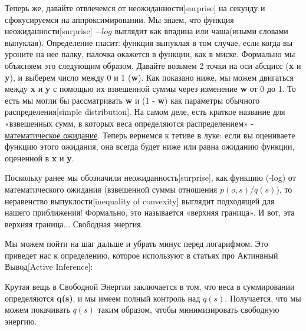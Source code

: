 \documentclass[twoside,leqno, 11pt]{article}
\begin{document}
	Теперь же, давайте отвлечемся от неожиданности[surprise] на секунду и сфокусируемся на аппроксимировании. Мы знаем, что функция неожиданности[surprise] $-log$ выглядит как впадина или чаша(иными словами выпуклая). Определение гласит: функция выпуклая в том случае, если когда вы уроните на нее палку, палочка окажется в функции, как в миске. Формально мы объясняем это следующим образом. Давайте возьмем 2 точки на оси абсцисс (\textbf{x} и \textbf{y}), и выберем число между 0 и 1 (\textbf{w}). Как показано ниже, мы можем двигаться между \textbf{x} и \textbf{y} с помощью их взвешенной суммы через изменение \textbf{w} от 0 до 1. То есть мы могли бы рассматривать \textbf{w} и (1 - \textbf{w}) как параметры обычного распределения[simple distribution]. На самом деле, есть краткое название для «взвешенных сумм, в которых веса определяются распределением» - \href{https://en.wikipedia.org/wiki/Expected_value}{математическое ожидание}. Теперь вернемся к тетиве в луке: если вы оцениваете функцию этого ожидания, она всегда будет ниже или равна ожиданию функции, оцененной в \textbf{x} и \textbf{y}.
	
	
	Поскольку ранее мы обозначили неожиданность[surprise], как функцию (-log) от математического ожидания (взвешенной суммы отношения $p(o, s) / q(s)$), то неравенство выпуклости[inequality of convexity] выглядит подходящей для нашего приближения! Формально, это называется «верхняя граница». И вот, эта верхняя граница... Свободная энергия.
	
	 
	Мы можем пойти на шаг дальше и убрать минус перед логарифмом. Это приведет нас к определению, которое используют в статьях про Актинвный Вывод[Active Inference]:
	

	Крутая вещь в Свободной Энергии заключается в том, что веса в суммировании определяются \textbf{q(s)}, и мы имеем полный контроль над $q(s)$. Получается, что мы можем покачивать $q(s)$ таким образом, чтобы минимизировать свободную энергию.
	
\end{document}
